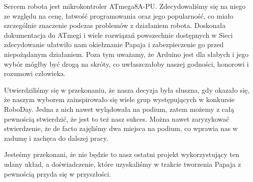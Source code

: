 Sercem robota jest mikrokontroler ATmega8A-PU. Zdecydowaliśmy się na niego ze względu na cenę, łatwość programowania oraz jego popularność, co miało szczególnie znaczenie podczas problemów z działaniem robota. Doskonała dokumentacja do ATmegi i wiele rozwiązań powszechnie dostępnych w Sieci zdecydowanie ułatwiło nam okiełznanie Papaja i zabezpieczenie go przed niepożądanym działaniem. Poza tym uważamy, że Arduino jest dla słabych i jego wybór mógłby być drogą na skróty, co uwłaszczałoby naszej godności, honorowi i rozumowi człowieka.

Utwierdziliśmy się w przekonaniu, że nasza decyzja była słuszna, gdy okazało się, że naszym wyborem zainspirowało się wiele grup występujących w konkursie RoboDay. Jedna z nich nawet wylądowała na podium, zatem możemy z całą pewnością stwierdzić, że jest to też nasz sukces. Można nawet zaryzykować stwierdzenie, że de facto zajęliśmy dwa miejsca na podium, co wprawia nas w zadumę i zachęca do dalszej pracy.

Jesteśmy przekonani, że nie będzie to nasz ostatni projekt wykorzystujący ten udany układ, a doświadczenie, które uzyskaliśmy w trakcie tworzenia Papaja z pewnością przyda się w przyszłości.

